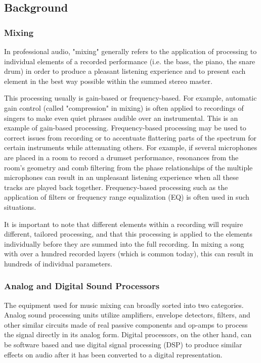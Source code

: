 \documentclass[11pt, letterpaper,titlepage]{article}
\begin{document}
\subsection{Background}

\subsubsection{Mixing}

In professional audio, "mixing" generally refers to the application of processing to  individual elements of a recorded performance (i.e. the bass, the piano, the snare drum) in order to produce a pleasant listening experience and to present each element in the best way possible within the summed stereo master.

This processing usually is gain-based or frequency-based. For example, automatic gain control (called "compression" in mixing) is often applied to recordings of singers to make even quiet phrases audible over an instrumental. This is an example of gain-based processing. Frequency-based processing may be used to correct issues from recording or to accentuate flattering parts of the spectrum for certain instruments while attenuating others. For example, if several microphones are placed in a room to record a drumset performance, resonances from the room's geometry and comb filtering from the phase relationships of the multiple microphones can result in an unpleasant listening experience when all these tracks are played back together. Frequency-based processing such as the application of filters or frequency range equalization (EQ) is often used in such situations.

It is important to note that different elements within a recording will require different, tailored processing, and that this processing is applied to the elements individually before they are summed into the full recording. In mixing a song with over a hundred recorded layers (which is common today), this can result in hundreds of individual parameters.

\subsubsection{Analog and Digital Sound Processors}

The equipment used for music mixing can broadly sorted into two categories. Analog sound processing units utilize amplifiers, envelope detectors, filters, and other similar circuits made of real passive components and op-amps to process the signal directly in its analog form. Digital processors, on the other hand, can be software based and use digital signal processing (DSP) to produce similar effects on audio after it has been converted to a digital representation.
\end{document}
